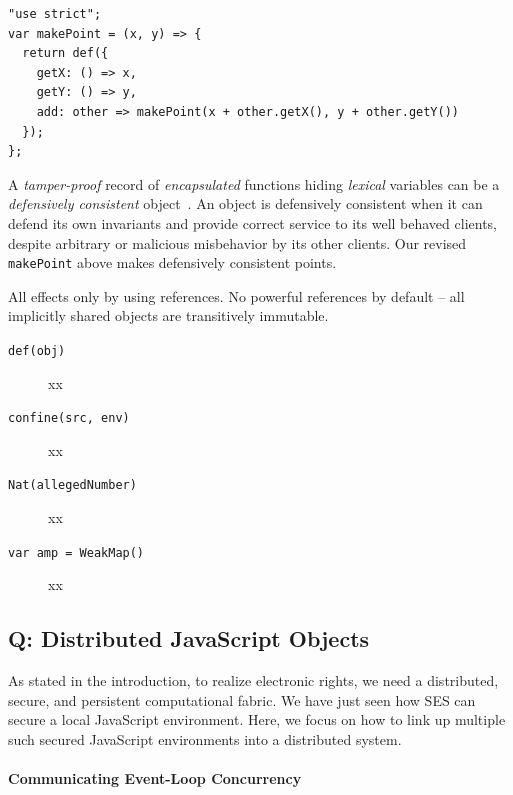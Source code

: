 \documentclass{llncs}
\begin{document}
\begin{verbatim}
"use strict";
var makePoint = (x, y) => {
  return def({
    getX: () => x,
    getY: () => y,
    add: other => makePoint(x + other.getX(), y + other.getY())
  });
};
\end{verbatim}

A \emph{tamper-proof} record of \emph{encapsulated} functions hiding \emph{lexical} variables can be a \emph{defensively consistent} object~\cite{RobustComposition}. An object is defensively consistent when it can defend its own invariants and provide correct service to its well behaved clients, despite arbitrary or malicious misbehavior by its other clients. Our revised {\tt makePoint} above makes defensively consistent points.

All effects only by using references.
No powerful references by default -- all implicitly shared objects are transitively immutable. 


\begin{description}
\item[{\tt def(obj)}] xx

\item[{\tt confine(src, env)}] xx

\item[{\tt Nat(allegedNumber)}] xx

\item[{\tt var amp = WeakMap()}] xx

\end{description}

\subsection{Q: Distributed JavaScript Objects}

As stated in the introduction, to realize electronic rights, we need a distributed, secure, and persistent computational fabric. We have just seen how SES can secure a local JavaScript environment. Here, we focus on how to link up multiple such secured JavaScript environments into a distributed system.


\paragraph{Communicating Event-Loop Concurrency}
\end{document}
